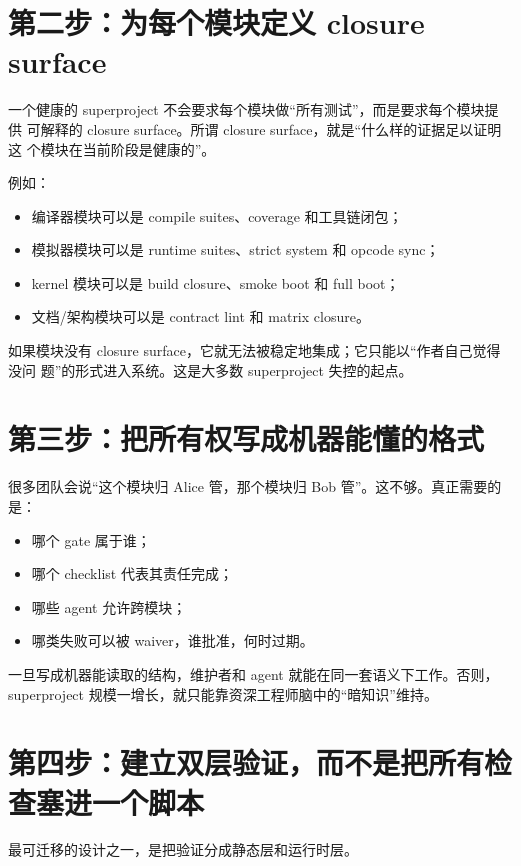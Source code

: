 \documentclass[UTF8,11pt,a4paper,oneside]{ctexbook}
\begin{document}
\section{第二步：为每个模块定义 closure surface}

一个健康的 superproject 不会要求每个模块做“所有测试”，而是要求每个模块提供
可解释的 closure surface。所谓 closure surface，就是“什么样的证据足以证明这
个模块在当前阶段是健康的”。

例如：

\begin{itemize}
  \item 编译器模块可以是 compile suites、coverage 和工具链闭包；
  \item 模拟器模块可以是 runtime suites、strict system 和 opcode sync；
  \item kernel 模块可以是 build closure、smoke boot 和 full boot；
  \item 文档/架构模块可以是 contract lint 和 matrix closure。
\end{itemize}

如果模块没有 closure surface，它就无法被稳定地集成；它只能以“作者自己觉得没问
题”的形式进入系统。这是大多数 superproject 失控的起点。

\section{第三步：把所有权写成机器能懂的格式}

很多团队会说“这个模块归 Alice 管，那个模块归 Bob 管”。这不够。真正需要的是：

\begin{itemize}
  \item 哪个 gate 属于谁；
  \item 哪个 checklist 代表其责任完成；
  \item 哪些 agent 允许跨模块；
  \item 哪类失败可以被 waiver，谁批准，何时过期。
\end{itemize}

一旦写成机器能读取的结构，维护者和 agent 就能在同一套语义下工作。否则，
superproject 规模一增长，就只能靠资深工程师脑中的“暗知识”维持。

\section{第四步：建立双层验证，而不是把所有检查塞进一个脚本}

最可迁移的设计之一，是把验证分成静态层和运行时层。
\end{document}
